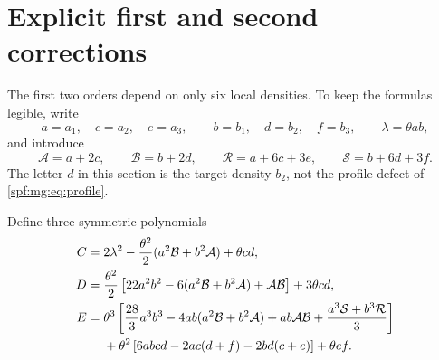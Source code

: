 \documentclass[11pt]{article}
\numberwithin{equation}{section}
\theoremstyle{definition}
\theoremstyle{remark}
\theoremstyle{definition}
\begin{document}
\section{Explicit first and second corrections}
\label{spf:mg:sec:explicit}

The first two orders depend on only six local densities. To keep the
formulas legible, write
\begin{equation}
 a=a_1,\quad c=a_2,\quad e=a_3,
 \qquad b=b_1,\quad d=b_2,\quad f=b_3,
 \qquad \lambda=\theta ab,
 \label{spf:mg:eq:abc}
\end{equation}
and introduce
\begin{equation}
 \mathcal A=a+2c,\qquad \mathcal B=b+2d,
 \qquad \mathcal R=a+6c+3e,\qquad \mathcal S=b+6d+3f.
 \label{spf:mg:eq:invariants}
\end{equation}
The letter $d$ in this section is the target density $b_2$, not the
profile defect of \eqref{spf:mg:eq:profile}.

Define three symmetric polynomials
\begin{align}
 C={}&2\lambda^2-\frac{\theta^2}{2}
              (a^2\mathcal B+b^2\mathcal A)+\theta cd,
 \label{spf:mg:eq:C}\\
 D={}&\frac{\theta^2}{2}
       \left[22a^2b^2-6(a^2\mathcal B+b^2\mathcal A)+\mathcal A\mathcal B\right]
          +3\theta cd,
 \label{spf:mg:eq:D}\\
 E={}&\theta^3\left[
       \frac{28}{3}a^3b^3-4ab(a^2\mathcal B+b^2\mathcal A)
       +ab\mathcal A\mathcal B+\frac{a^3\mathcal S+b^3\mathcal R}{3}\right]
       \notag\\
    &+\theta^2\left[6abcd-2ac(d+f)-2bd(c+e)\right]
       +\theta ef.
 \label{spf:mg:eq:E}
\end{align}
\end{document}
